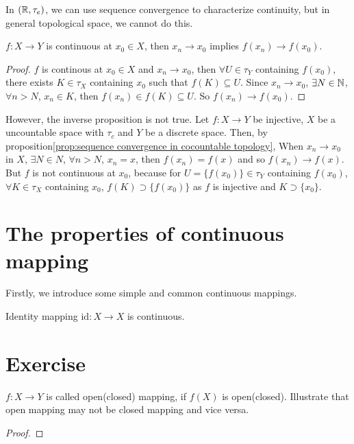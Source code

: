 In $(\mathbb{R},\tau_e)$, we can use sequence convergence to characterize continuity, 
but in general topological space, we cannot do this.
\begin{proposition}{}{}
    $f:X\rightarrow Y$ is continuous at $x_0\in X$, then $x_n\rightarrow x_0$ implies $f(x_n)\rightarrow f(x_0)$.
\end{proposition}
\begin{proof}
    $f$ is continous at $x_0\in X$ and $x_n\rightarrow x_0$, 
    then $\forall U\in\tau_Y$ containing $f(x_0)$, 
    there exists $K\in\tau_X$ containing $x_0$ such that $f(K)\subseteq U$.
    Since $x_n\rightarrow x_0$, $\exists N\in\mathbb{N}$, $\forall n>N$, $x_n\in K$, then $f(x_n)\in f(K)\subseteq U$.
    So $f(x_n)\rightarrow f(x_0)$.
\end{proof}
However, the inverse proposition is not true. 
Let $f:X\rightarrow Y$ be injective, $X$ be a uncountable space with $\tau_c$ and $Y$ be a discrete space.
Then, by proposition\ref{prop:sequence convergence in cocountable topology}, 
When $x_n\rightarrow x_0$ in $X$, $\exists N\in N$, $\forall n>N$, $x_n=x$, 
then $f(x_n)=f(x)$ and so $f(x_n)\rightarrow f(x)$.
But $f$ is not continuous at $x_0$, because for $U=\{f(x_0)\}\in \tau_Y$ containing $f(x_0)$, 
$\forall K\in \tau_X$ containing $x_0$, $f(K)\supset \{f(x_0)\}$ as $f$ is injective and $K\supset \{x_0\}$.


\section{The properties of continuous mapping}

Firstly, we introduce some simple and common continuous mappings.
\begin{proposition}{}{}
    Identity mapping $\text{id}:X\rightarrow X$ is continuous.
\end{proposition}


\section{Exercise}

\begin{exercise}{}{}
    $f:X\rightarrow Y$ is called open(closed) mapping, if $f(X)$ is open(closed). 
    Illustrate that open mapping may not be closed mapping and vice versa.
\end{exercise}
\begin{proof}
    
\end{proof}

